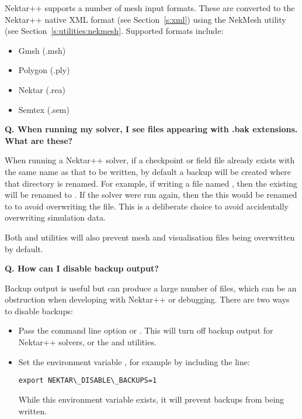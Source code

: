 Nektar++ supports a number of mesh input formats. These are converted to the
Nektar++ native XML format (see Section~\ref{s:xml}) using the NekMesh utility
(see Section~\ref{s:utilities:nekmesh}. Supported formats include:
\begin{itemize}
\item Gmsh (.msh)
\item Polygon (.ply)
\item Nektar (.rea)
\item Semtex (.sem)
\end{itemize}

\textbf{Q. When running my solver, I see files appearing with {\inltt .bak}
  extensions. What are these?}

When running a Nektar++ solver, if a checkpoint or field file already exists
with the same name as that to be written, by default a backup will be created
where that directory is renamed. For example, if writing a file named
, then the existing  will be renamed to
. If the solver were run again, then the
 this would be renamed to  to avoid
overwriting the  file. This is a deliberate choice to
avoid accidentally overwriting simulation data.

Both  and  utilities will also prevent mesh
and visualisation files being overwritten by default.

\textbf{Q. How can I disable backup output?}

Backup output is useful but can produce a large number of files, which can be an
obstruction when developing with Nektar++ or debugging. There are two ways to
disable backups:

\begin{itemize}
  \item Pass the command line option  or . This
    will turn off backup output for Nektar++ solvers, or the  and
     utilities.
  \item Set the environment variable , for
    example by including the line:
    \begin{lstlisting}[style=BashInputStyle]
      export NEKTAR\_DISABLE\_BACKUPS=1
    \end{lstlisting}
    While this environment variable exists, it will prevent backups from being
    written.
\end{itemize}
